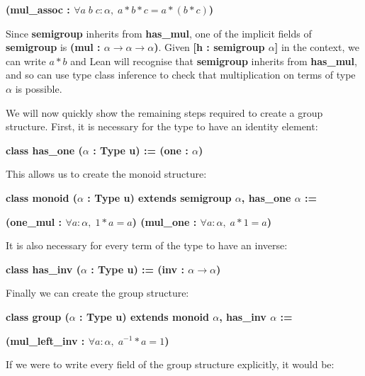 \documentclass[runningheads,a4paper]{llncs}
\renewcommand{\a}{\alpha}
\renewcommand{\-}{\setminus}
\begin{document}
\hspace{6 em}\textbf{(mul\_assoc : $\forall a\; b\; c : \a,\; a * b * c = a * (b * c)$)}
\vspace{2 mm}

Since \textbf{semigroup} inherits from \textbf{has\_mul}, one of the implicit fields of \textbf{semigroup} is \textbf{(mul : $\a \to \a \to \a$)}. Given \textbf{[h : semigroup $\a$]} in the context, we can write $a * b$ and Lean will recognise that \textbf{semigroup} inherits from \textbf{has\_mul}, and so can use type class inference to check that multiplication on terms of type $\a$ is possible.

We will now quickly show the remaining steps required to create a group structure. First, it is necessary for the type to have an identity element:

\vspace{2 mm}
\hspace{4 em}\textbf{class has\_one ($\a$ : Type u) := (one : $\a$)}
\vspace{2 mm}

This allows us to create the monoid structure:

\vspace{2 mm}
\hspace{4 em}\textbf{class monoid ($\a$ : Type u) extends semigroup $\a$, has\_one $\a$ := }

\hspace{6 em}\textbf{(one\_mul : $\forall a : \a,\; 1 * a = a$) (mul\_one : $\forall a : \a,\; a * 1 = a$)}
\vspace{2 mm}

It is also necessary for every term of the type to have an inverse:

\vspace{2 mm}
\hspace{4 em}\textbf{class has\_inv ($\a$ : Type u) := (inv : $\a \to \a$)}
\vspace{2 mm}

Finally we can create the group structure:

\vspace{2 mm}
\hspace{4 em}\textbf{class group ($\a$ : Type u) extends monoid $\a$, has\_inv $\a$ := }

\hspace{6 em}\textbf{(mul\_left\_inv : $\forall a : \a,\; a^{-1} * a = 1$)}
\vspace{2 mm}

If we were to write every field of the group structure explicitly, it would be:
\end{document}
